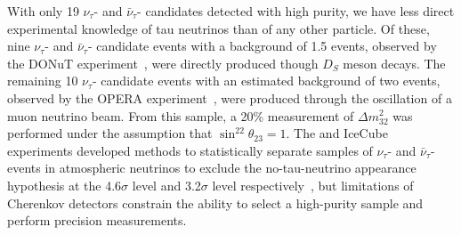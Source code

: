 With only 19 $\nu_{\tau}$- and $\bar{\nu}_{\tau}$- candidates detected with high purity, we have less direct experimental knowledge of tau neutrinos than of any other  particle. Of these, nine $\nu_{\tau}$- and $\bar{\nu}_{\tau}$- candidate events with a background of 1.5 events, observed by the DONuT experiment~\cite{Kodama:2000mp, Kodama:2007aa}, were directly produced though $D_S$ meson decays.  The remaining 10 $\nu_{\tau}$- candidate events with an estimated background of two events, observed by the OPERA experiment~\cite{Guler:2000bd,Agafonova:2018auq}, were produced through the oscillation of a muon neutrino beam. From this sample, a 20\% measurement of $\Delta m^{2}_{32}$ was performed under the assumption that $\sin^22\theta_{23} = 1$.  The \superk and IceCube experiments developed methods to statistically separate samples of $\nu_{\tau}$- and $\bar{\nu}_{\tau}$- events in atmospheric neutrinos to exclude the no-tau-neutrino appearance hypothesis at the 4.6$\sigma$ level and 3.2$\sigma$ level respectively~\cite{Abe:2012jj, Li:2017dbe, Aartsen:2019tjl}, but limitations of Cherenkov detectors constrain the ability to select a high-purity sample and perform precision measurements.


